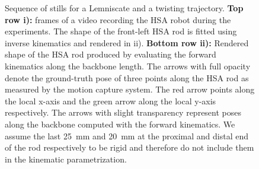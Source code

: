 \begin{figure}[t]
    \centering
    
    \caption{Sequence of stills for a Lemniscate and a twisting trajectory. 
    \textbf{Top row i):} frames of a video recording the HSA robot during the experiments. The shape of the front-left HSA rod is fitted using inverse kinematics and rendered in ii).
    \textbf{Bottom row ii):} Rendered shape of the HSA rod produced by evaluating the forward kinematics along the backbone length. The arrows with full opacity denote the ground-truth pose of three points along the HSA rod as measured by the motion capture system. The red arrow points along the local x-axis and the green arrow along the local y-axis respectively. The arrows with slight transparency represent poses along the backbone computed with the forward kinematics.
    We assume the last \SI{25}{mm} and \SI{20}{mm} at the proximal and distal end  of the rod respectively to be rigid and therefore do not include them in the kinematic parametrization.
    }\label{fig:hsamodel:experiment_inverse_kinematics_sequence_of_stills}
\end{figure}

